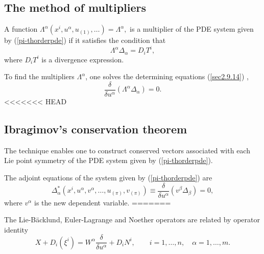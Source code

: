 \begin{defn}
\subsection{The method of multipliers}
\begin{defn}
 A function    $  \Lambda^{\alpha} \left( x^i, u^{\alpha},u_{(1)}, \ldots \right) =\Lambda^{\alpha},$  is a multiplier of the PDE system given by (\ref{pi-thorderpde}) if it satisfies the condition that \citep{olver2000applications}
\begin{equation}  \Lambda^{\alpha} \Delta_{\alpha} = D_iT^i, \label{sec2.9.13} 
\end{equation} where $D_iT^i$ is a divergence expression. \label{def2.2.6}
\end{defn}
\begin{defn}	To find the multipliers $\Lambda^{\alpha}$, one solves the determining equations (\ref{sec2.9.14})  \citep{bluman2008symmetry}, \begin{equation} \frac{ \delta }{ \delta u^{\alpha}} ( \Lambda^{\alpha} \Delta_{\alpha} )=0. \label{sec2.9.14}
\end{equation}
<<<<<<< HEAD
\end{defn}

\subsection{Ibragimov's conservation theorem \label{ibra}}
The technique \citep{ibragimov2007new}  enables one to construct conserved vectors associated with each  Lie point symmetry of the PDE system given by (\ref{pi-thorderpde}).
 \begin{defn} The adjoint equations of the system given by (\ref{pi-thorderpde})  are  \begin{equation} \Delta_{\alpha}^{*}\left( x^i, u^{\alpha} , v^{\alpha}, \ldots,u_{(\pi)},v_{(\pi)} \right) \equiv   \frac{ \delta }{ \delta u^{\alpha }} ( v^{\beta} \Delta_{\beta})   =0, \label{sec2.9.15}
	\end{equation} where  $ v^{\alpha}$ is the new dependent variable.
=======

The Lie-B\"acklund, Euler-Lagrange and Noether operators are  related by operator identity \citep{ibragimov1999elementary}\begin{equation} X + D_i( \xi^i) = W^{\alpha} \frac{ \delta }{ \delta u^{\alpha}} + D_i N^i,\quad  \quad i = 1, \ldots, n, \quad  \alpha = 1, \ldots,m. \label{2.9.9}
\end{equation}


\end{defn}
\end{defn}
